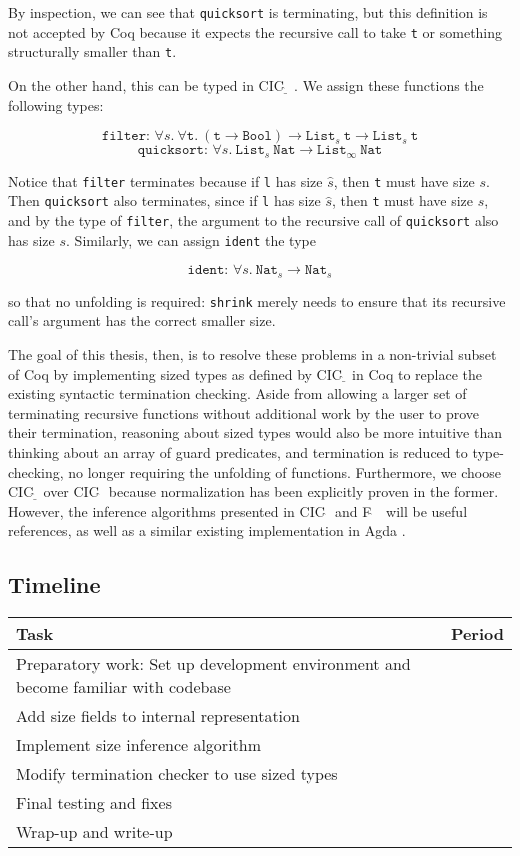 \documentclass{article}
\newcommand{\CIChat}{CIC$\widehat{~}$\ }
\newcommand{\CIChatbar}{CIC$\widehat{\underline{~}}$\ }
\newcommand{\Fhat}{F$\widehat{~}$\ }
\begin{document}
By inspection, we can see that \texttt{quicksort} is terminating, but this definition is not accepted by Coq because it expects the recursive call to take \texttt{t} or something structurally smaller than \texttt{t}.

On the other hand, this can be typed in \CIChatbar. We assign these functions the following types:

$$\texttt{filter: } \forall s.\ \forall \texttt{t}.\ (\texttt{t} \rightarrow \texttt{Bool}) \rightarrow \texttt{List}_s\ \texttt{t} \rightarrow \texttt{List}_s\ \texttt{t}$$
$$\texttt{quicksort: } \forall s.\ \texttt{List}_s\ \texttt{Nat} \rightarrow \texttt{List}_\infty\ \texttt{Nat}$$

Notice that \texttt{filter} terminates because if \texttt{l} has size $\hat{s}$, then \texttt{t} must have size $s$. Then \texttt{quicksort} also terminates, since if \texttt{l} has size $\hat{s}$, then \texttt{t} must have size $s$, and by the type of \texttt{filter}, the argument to the recursive call of \texttt{quicksort} also has size $s$. Similarly, we can assign \texttt{ident} the type

$$\texttt{ident: } \forall s.\ \texttt{Nat}_s \rightarrow \texttt{Nat}_s$$

so that no unfolding is required: \texttt{shrink} merely needs to ensure that its recursive call's argument has the correct smaller size.

The goal of this thesis, then, is to resolve these problems in a non-trivial subset of Coq by implementing sized types as defined by \CIChatbar in Coq to replace the existing syntactic termination checking. Aside from allowing a larger set of terminating recursive functions without additional work by the user to prove their termination, reasoning about sized types would also be more intuitive than thinking about an array of guard predicates, and termination is reduced to type-checking, no longer requiring the unfolding of functions. Furthermore, we choose \CIChatbar over \CIChat because normalization has been explicitly proven in the former. However, the inference algorithms presented in \CIChat and \Fhat \cite{inference} will be useful references, as well as a similar existing implementation in Agda \cite{miniagda}.

\subsection{Timeline}
\begin{tabular}{|l|l|}
    \hline
    \textbf{Task} & \textbf{Period} \\
    \hline
    Preparatory work: Set up development environment and become familiar with codebase & \\
    Add size fields to internal representation & \\
    Implement size inference algorithm & \\
    Modify termination checker to use sized types & \\
    Final testing and fixes & \\
    Wrap-up and write-up & \\
    \hline
\end{tabular}
\end{document}
